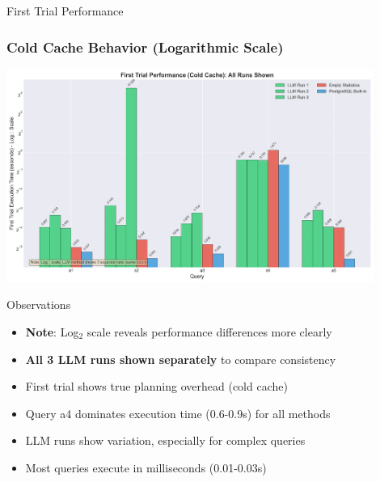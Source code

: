 \documentclass{beamer}
\begin{document}
\begin{frame}{First Trial Performance}
\frametitle{Cold Cache Behavior (Logarithmic Scale)}

\begin{center}
\includegraphics[width=0.9\textwidth]{images/first_trial_comparison_fixed.png}
\end{center}

\begin{exampleblock}{Observations}
\begin{itemize}
    \item \textbf{Note}: Log$_2$ scale reveals performance differences more clearly
    \item \textbf{All 3 LLM runs shown separately} to compare consistency
    \item First trial shows true planning overhead (cold cache)
    \item Query a4 dominates execution time (0.6-0.9s) for all methods
    \item LLM runs show variation, especially for complex queries
    \item Most queries execute in milliseconds (0.01-0.03s)
\end{itemize}
\end{exampleblock}


\end{frame}
\end{document}
